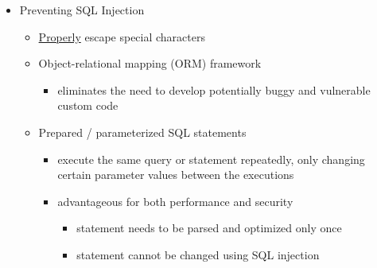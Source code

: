 \documentclass[final]{article}
\begin{document}
\begin{itemize}[nosep]
\begin{itemize}[nosep]
          \end{itemize}
    \item Preventing SQL Injection
          \begin{itemize}[nosep]
              \item \underline{Properly} escape special characters
              \item Object-relational mapping (ORM) framework
                    \begin{itemize}[nosep]
                        \item eliminates the need to develop potentially buggy and vulnerable custom code
                    \end{itemize}
              \item Prepared / parameterized SQL statements
                    \begin{itemize}[nosep]
                        \item execute the same query or statement repeatedly, only changing certain parameter values between the executions
                        \item advantageous for both performance and security
                              \begin{itemize}[nosep]
                                  \item statement needs to be parsed and optimized only once
                                  \item statement cannot be changed using SQL injection
                              \end{itemize}
                    \end{itemize}
          \end{itemize}
\end{itemize}
\end{document}
